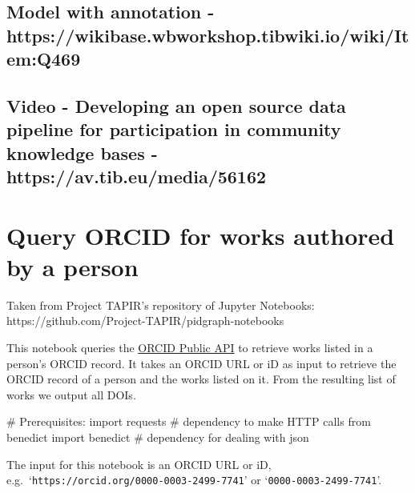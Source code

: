 \documentclass[
  letterpaper,
  DIV=11,
  numbers=noendperiod]{scrreprt}
\newenvironment{Shaded}{\begin{snugshade}}{\end{snugshade}}
\newcommand{\CommentTok}[1]{\textcolor[rgb]{0.37,0.37,0.37}{#1}}
\newcommand{\ImportTok}[1]{\textcolor[rgb]{0.00,0.46,0.62}{#1}}
\newcommand{\NormalTok}[1]{\textcolor[rgb]{0.00,0.23,0.31}{#1}}
\begin{document}
\hypertarget{model-with-annotation---httpswikibase.wbworkshop.tibwiki.iowikiitemq469}{%
\section{Model with annotation -
https://wikibase.wbworkshop.tibwiki.io/wiki/Item:Q469}\label{model-with-annotation---httpswikibase.wbworkshop.tibwiki.iowikiitemq469}}

\hypertarget{video---developing-an-open-source-data-pipeline-for-participation-in-community-knowledge-bases---httpsav.tib.eumedia56162}{%
\section{Video - Developing an open source data pipeline for
participation in community knowledge bases -
https://av.tib.eu/media/56162}\label{video---developing-an-open-source-data-pipeline-for-participation-in-community-knowledge-bases---httpsav.tib.eumedia56162}}


\hypertarget{query-orcid-for-works-authored-by-a-person}{%
\chapter{Query ORCID for works authored by a
person}\label{query-orcid-for-works-authored-by-a-person}}

Taken from Project TAPIR's repository of Jupyter Notebooks:
https://github.com/Project-TAPIR/pidgraph-notebooks

This notebook queries the \href{https://pub.orcid.org/v3.0/}{ORCID
Public API} to retrieve works listed in a person's ORCID record. It
takes an ORCID URL or iD as input to retrieve the ORCID record of a
person and the works listed on it. From the resulting list of works we
output all DOIs.

\begin{Shaded}
\begin{Highlighting}[]
\CommentTok{\# Prerequisites:}
\ImportTok{import}\NormalTok{ requests                        }\CommentTok{\# dependency to make HTTP calls}
\ImportTok{from}\NormalTok{ benedict }\ImportTok{import}\NormalTok{ benedict          }\CommentTok{\# dependency for dealing with json}
\end{Highlighting}
\end{Shaded}

The input for this notebook is an ORCID URL or iD,
e.g.~`\texttt{https://orcid.org/0000-0003-2499-7741}' or
`\texttt{0000-0003-2499-7741}'.
\end{document}
